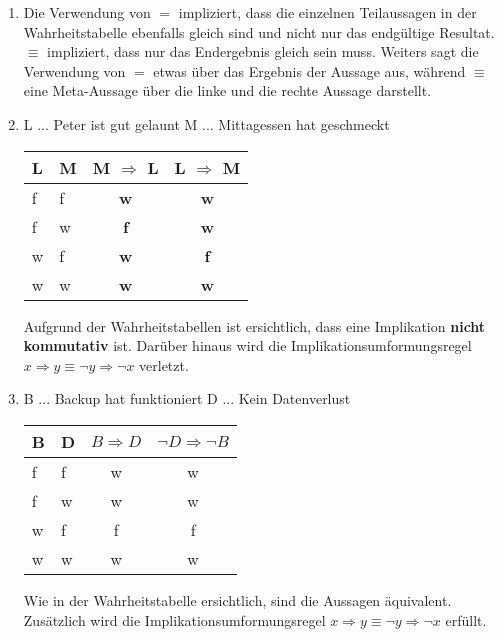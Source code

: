 \documentclass[a4paper]{article}
\begin{document}
\begin{enumerate}
		\item
		Die Verwendung von $=$ impliziert, dass die einzelnen Teilaussagen in der Wahrheitstabelle ebenfalls gleich sind und nicht nur das endgültige Resultat. $\equiv$ impliziert, dass nur das Endergebnis gleich sein muss.
		\newline
		Weiters sagt die Verwendung von $=$ etwas über das Ergebnis der Aussage aus, während $\equiv$ eine Meta-Aussage über die linke und die rechte Aussage darstellt.
		
		\item
		L ... Peter ist gut gelaunt
		\newline
		M ... Mittagessen hat geschmeckt
		
		\begin{tabular}{|l|l|c|c|}
			\firsthline
			L & M & M $\Rightarrow$ L & L $\Rightarrow$ M \\
			\hline
			f & f & \textbf{w} & \textbf{w} \\
			f & w & \textbf{f} & \textbf{w} \\
			w & f & \textbf{w} & \textbf{f} \\
			w & w & \textbf{w} & \textbf{w} \\
			\hline
		\end{tabular}
		
		Aufgrund der Wahrheitstabellen ist ersichtlich, dass eine Implikation \textbf{nicht kommutativ} ist.
		\newline
		Darüber hinaus wird die Implikationsumformungsregel $x \Rightarrow y \equiv \lnot y \Rightarrow \lnot x$ verletzt.
		\item
		B ... Backup hat funktioniert
		\newline
		D ... Kein Datenverlust
		
		\begin{tabular}{|l|l|c|c|}
			\firsthline
			B & D & $B \Rightarrow D$ & $\lnot D \Rightarrow \lnot B$ \\			
			\hline
				f & f & w & w \\
				f & w & w & w \\
				w & f & f & f \\
				w & w & w & w \\
			\hline
		\end{tabular}
		
		Wie in der Wahrheitstabelle ersichtlich, sind die Aussagen äquivalent.
		\newline
		Zusätzlich wird die Implikationsumformungsregel $x \Rightarrow y \equiv \lnot y \Rightarrow \lnot x$ erfüllt.
	\end{enumerate}
	
\end{document}

